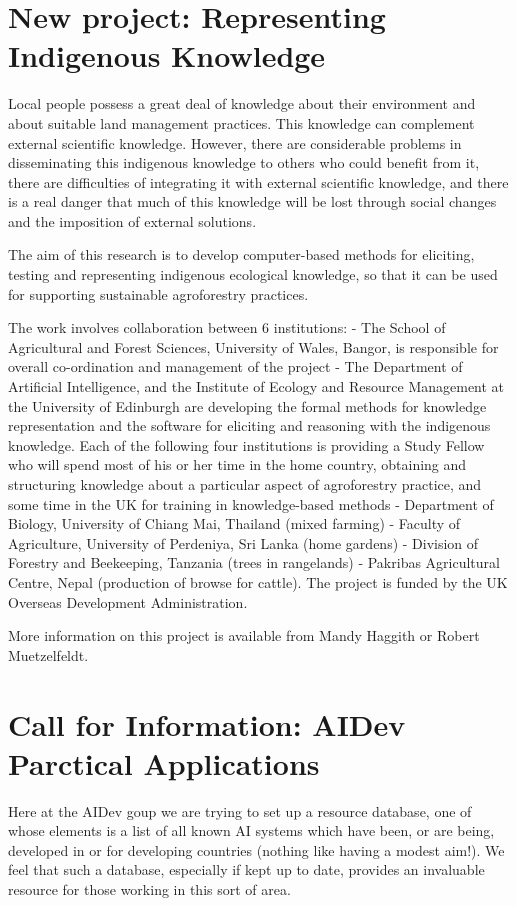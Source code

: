 


\section{New project: Representing Indigenous Knowledge}
  Local people possess a great deal of knowledge about their environment and
 about suitable land management practices.   This knowledge can complement
 external scientific knowledge.   However, there are considerable problems
 in disseminating this indigenous knowledge to others who could benefit from
 it, there are difficulties of integrating it with external scientific
 knowledge, and there is a real danger that much of this knowledge will be
 lost through social changes and the imposition of external solutions.
 
 The aim of this research is to develop computer-based methods for eliciting,
 testing and representing indigenous ecological knowledge, so that it can be
 used for supporting sustainable agroforestry practices.
 
 The work involves collaboration between 6 institutions:
 - The School of Agricultural and Forest Sciences, University of Wales,
   Bangor, is responsible for overall co-ordination and management of 
   the project
 - The Department of Artificial Intelligence, and the Institute of Ecology
   and Resource Management at the University of Edinburgh are developing
   the formal methods for knowledge representation and the software for
   eliciting and reasoning with the indigenous knowledge.
 Each of the following four institutions is providing a Study Fellow who will
 spend most of his or her time in the home country, obtaining and structuring
 knowledge about a particular aspect of agroforestry practice, and some time
 in the UK for training in knowledge-based methods
 - Department of Biology, University of Chiang Mai, Thailand (mixed farming)
 - Faculty of Agriculture, University of Perdeniya, Sri Lanka (home gardens)
 - Division of Forestry and Beekeeping, Tanzania (trees in rangelands)
 - Pakribas Agricultural Centre, Nepal (production of browse for cattle).
  The project is funded by the UK Overseas Development Administration.

More information on this project is available from Mandy Haggith or
Robert Muetzelfeldt.

\section{Call for Information: AIDev Parctical Applications}
Here at the AIDev goup we are trying to set up a resource database, one
of whose elements is a list of all known AI systems which have been,
or are being, developed in or for developing countries (nothing like
having a modest aim!). We feel that such a database, especially if kept
up to date, provides an invaluable resource for those working in this
sort of area. 

